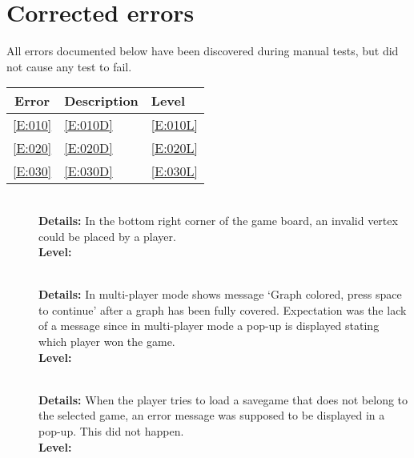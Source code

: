 \section{Corrected errors}
\label{section:corrected-errors}

All errors documented below have been discovered during manual tests, but did not cause any test to fail.\par

\begin{tabular}{cll}

\hline
	\textbf{Error} & \textbf{Description} & \textbf{Level} \\
	\hline
	\ref{E:010} & \ref{E:010D} & \ref{E:010L} \\
	\ref{E:020} & \ref{E:020D} & \ref{E:020L} \\
	\ref{E:030} & \ref{E:030D} & \ref{E:030L} \\
	\hline
\end{tabular}

\begin{description}
	\item[] \textbf{} \\
	\textbf{Details:} In the bottom right corner of the \twixt game board, an invalid vertex could be placed by a player. \\
	\textbf{Level:} 

	\item[] \textbf{} \\
	\textbf{Details:} In multi-player mode \graphcoloring shows message `Graph colored, press space to continue' after a graph has been fully covered. Expectation was the lack of a message since in multi-player mode a pop-up is displayed stating which player won the game. \\
	\textbf{Level:} 
	
	\item[] \textbf{} \\
	\textbf{Details:} When the player tries to load a savegame that does not belong to the selected game, an error message 
						was supposed to be displayed in a pop-up. This did not happen. \\
	\textbf{Level:} 
\end{description}